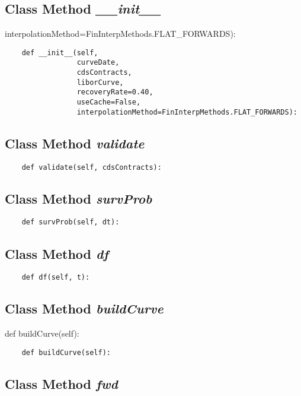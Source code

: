\documentclass[twoside,11pt]{book}
\begin{document}
\subsection{Class Method {\it \_\_init\_\_}}
interpolationMethod=FinInterpMethods.FLAT\_FORWARDS):

\begin{lstlisting}
    def __init__(self,
                 curveDate,
                 cdsContracts,
                 liborCurve,
                 recoveryRate=0.40,
                 useCache=False,
                 interpolationMethod=FinInterpMethods.FLAT_FORWARDS):
\end{lstlisting}

\subsection{Class Method {\it validate}}


\begin{lstlisting}
    def validate(self, cdsContracts):
\end{lstlisting}

\subsection{Class Method {\it survProb}}


\begin{lstlisting}
    def survProb(self, dt):
\end{lstlisting}

\subsection{Class Method {\it df}}


\begin{lstlisting}
    def df(self, t):
\end{lstlisting}

\subsection{Class Method {\it buildCurve}}
def buildCurve(self):

\begin{lstlisting}
    def buildCurve(self):
\end{lstlisting}

\subsection{Class Method {\it fwd}}
\end{document}
